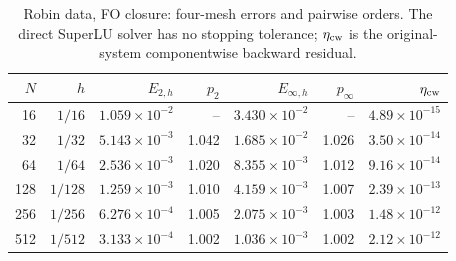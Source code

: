 \begin{table}[htbp]
\centering
\small
\setlength{\tabcolsep}{4pt}
\begin{tabular}{rrrrrrr}
\toprule
$N$ & $h$ & $E_{2,h}$ & $p_2$ & $E_{\infty,h}$ & $p_\infty$ & $\eta_{\rm cw}$ \\
\midrule
16 & $1/16$ & $1.059\times10^{-2}$ & -- & $3.430\times10^{-2}$ & -- & $4.89\times10^{-15}$ \\
32 & $1/32$ & $5.143\times10^{-3}$ & 1.042 & $1.685\times10^{-2}$ & 1.026 & $3.50\times10^{-14}$ \\
64 & $1/64$ & $2.536\times10^{-3}$ & 1.020 & $8.355\times10^{-3}$ & 1.012 & $9.16\times10^{-14}$ \\
128 & $1/128$ & $1.259\times10^{-3}$ & 1.010 & $4.159\times10^{-3}$ & 1.007 & $2.39\times10^{-13}$ \\
256 & $1/256$ & $6.276\times10^{-4}$ & 1.005 & $2.075\times10^{-3}$ & 1.003 & $1.48\times10^{-12}$ \\
512 & $1/512$ & $3.133\times10^{-4}$ & 1.002 & $1.036\times10^{-3}$ & 1.002 & $2.12\times10^{-12}$ \\
\bottomrule
\end{tabular}
\caption{Robin data, FO closure: four-mesh errors and pairwise orders. The direct SuperLU solver has no stopping tolerance; $\eta_{\rm cw}$ is the original-system componentwise backward residual.}
\label{tab:refinement-robin-first}
\end{table}
